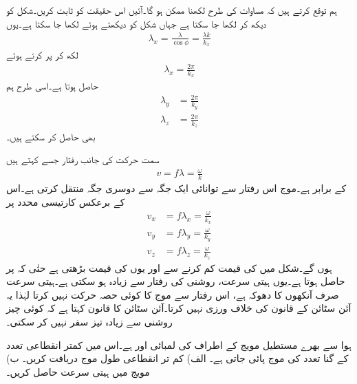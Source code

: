 ہم توقع کرتے ہیں کہ مساوات  کی طرح  لکھنا ممکن ہو گا۔آئیں اس حقیقت کو ثابت کریں۔شکل   کو دیکھ کر  لکھا جا سکتا ہے جہاں شکل کو دیکھتے ہوئے  لکھا جا سکتا ہے۔یوں
\begin{align*}
\lambda_x=\frac{\lambda}{\cos \phi}=\frac{\lambda k}{k_x}
\end{align*}
لکھ کر  پر کرتے ہوئے
\begin{align}
\lambda_x=\frac{2\pi}{k_x}
\end{align}
حاصل ہوتا ہے۔اسی طرح ہم 
\begin{align}
\lambda_y&=\frac{2\pi}{k_y}\\
\lambda_z&=\frac{2\pi}{k_z}
\end{align}
بھی حاصل کر سکتے ہیں۔

سمت حرکت کی جانب رفتار جسے  کہتے ہیں
\begin{align}
v=f\lambda=\frac{\omega}{k}
\end{align}
کے برابر ہے۔موج اس رفتار سے توانائی ایک جگہ سے دوسری جگہ منتقل کرتی ہے۔اس کے برعکس کارتیسی محدد پر  
\begin{align*}
v_x&=f \lambda_x=\frac{\omega}{k_x}\\
v_y&=f \lambda_y=\frac{\omega}{k_y}\\
v_z&=f \lambda_z=\frac{\omega}{k_z}
\end{align*}
ہوں گے۔شکل  میں  کی قیمت کم کرنے سے  اور یوں  کی قیمت بڑھتی ہے حتٰی کہ  پر  حاصل ہوتا ہے۔یوں ہیتی سرعت، روشنی کی رفتار سے زیادہ ہو سکتی ہے۔ہیتی سرعت  صرف آنکھوں کا دھوکہ ہے، اس رفتار سے موج کا کوئی حصہ حرکت نہیں کرتا لہٰذا یہ  آئن سٹائن کے قانون کی خلاف ورزی نہیں کرتا۔آئن سٹائن کا قانون کہتا ہے کہ کوئی چیز روشنی سے زیادہ تیز سفر نہیں کر سکتی۔

\newpage


ہوا سے بھرے مستطیل مویج کے اطراف کی لمبائی  اور  ہے۔اس میں کمتر انقطاعی تعدد کے  گنا تعدد کی موج پائی جاتی ہے۔ الف) کم تر انقطاعی طول موج دریافت کریں۔ ب) مویج میں ہیتی سرعت حاصل کریں۔

